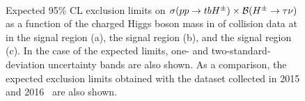 		\begin{figure}
			\centering
			 \\
			\caption{\label{fig:expected-limits} 
			Expected 95\% CL exclusion limits on $\sigma(pp\to tbH^{\pm})\times \mathrm{\cal{B}}(H^{\pm} \to \tau \nu)$ as a function of the charged Higgs boson mass in \LUMI of \pp collision data at \sqs in the \tauel signal region (a), the \taumu signal region (b), and the \taujets signal region (c). In the case of the expected limits, one- and two-standard-deviation uncertainty bands are also shown. As a comparison, the expected exclusion limits obtained with the dataset collected in 2015 and 2016~\cite{hpm-previous} are also shown.
			 }
		\end{figure}